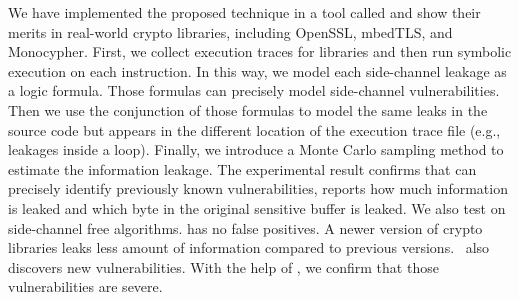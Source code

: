 We have implemented the proposed technique in a tool called \tool{} and show 
their merits in real-world crypto libraries, including OpenSSL, 
mbedTLS, and Monocypher.
First, we collect execution traces for libraries and then run 
symbolic execution on each instruction. In this way, we model
each side-channel leakage as a logic formula. Those
formulas can precisely model side-channel vulnerabilities. 
Then we use the conjunction of those formulas to model the 
same leaks in the source code but appears in the different location of
the execution trace file (e.g., leakages inside a loop).
Finally, we introduce a Monte Carlo sampling method to estimate 
the information leakage. 
The experimental result confirms
that \tool{} can precisely identify previously known vulnerabilities, 
reports how much information is leaked and which byte in the original sensitive 
buffer is leaked. We also test \tool{} on side-channel free algorithms. 
\tool{} has no false positives.
A newer version of crypto libraries leaks less amount of information 
compared to previous versions.
\tool\ also discovers new vulnerabilities. With the help of \tool{}, 
we confirm that those vulnerabilities are severe.





